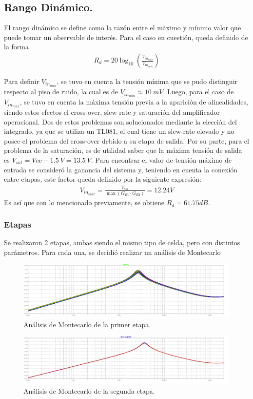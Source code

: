 \subsection{Rango Dinámico.}
El rango dinámico se define como la razón entre el máximo y mínimo valor que puede tomar un observable de interés. Para el caso en cuestión, queda definido de la forma
\begin{align}
R_d = 20 \log_{10} \left( \frac{V_{in_{max}}}{V_{in_{min}}} \right)
\end{align}

Para definir $V_{in_{min}}$, se tuvo en cuenta la tensión mínima que se pudo distinguir respecto al piso de ruido, la cual es de $V_{in_{min}} \approx 10 \ mV$. Luego, para el caso de $V_{in_{max}}$, se tuvo en cuenta la máxima tensión previa a la aparición de alinealidades, siendo estos efectos el cross-over, slew-rate y saturación del amplificador operacional. Dos de estos problemas son solucionados mediante la elección del integrado, ya que se utiliza un TL081, el cual tiene un slew-rate elevado y no posee el problema del cross-over debido a su etapa de salida. Por su parte, para el problema de la saturación, es de utilidad saber que la máxima tensión de salida es $V_{sat} = Vcc - 1.5 \ V = 13.5 \ V$. Para encontrar el valor de tensión máximo de entrada se consideró la ganancia del sistema y, teniendo en cuenta la conexión entre etapas, este factor queda definido por la siguiente expresión:
\begin{align}
V_{in_{max}}=\frac{V_{sat}}{  \max(G_{E1} \cdot G_{E2} )} = 12.24V
\end{align}
Es así que con lo mencionado previamente, se obtiene $R_d = 61.75dB$.

\subsubsection{Etapas}
Se realizaron 2 etapas, ambas siendo el mismo tipo de celda, pero con distintos parámetros. Para cada una, se decidió realizar un análisis de Montecarlo
\begin{figure}[H]
	\centering
	\includegraphics[width=\textwidth]{Imagenes-Ej2/mcE1.png}
	\caption{Análisis de Montecarlo de la primer etapa.}
	\label{fig:mc1}
\end{figure}
\begin{figure}[H]
	\centering
	\includegraphics[width=\textwidth]{Imagenes-Ej2/mcE2.png}
	\caption{Análisis de Montecarlo de la segunda etapa.}
	\label{fig:mc2}
\end{figure}

